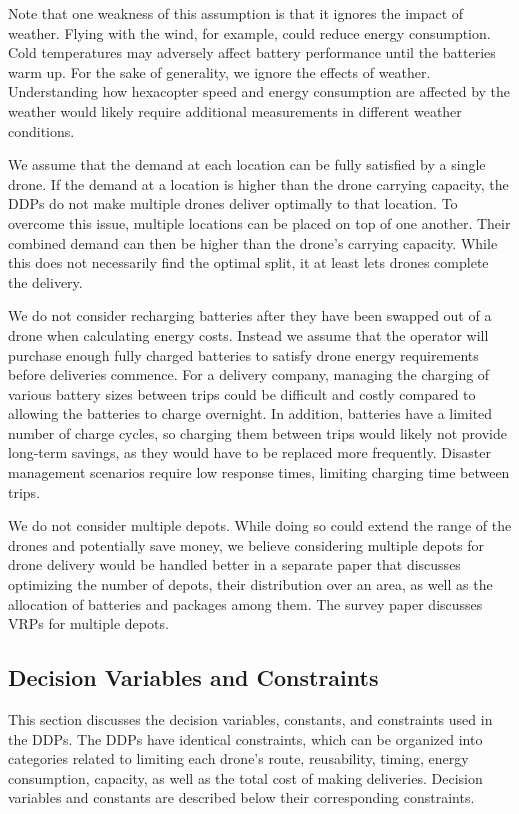\documentclass[journal]{IEEEtran}
\begin{document}
Note that one weakness of this assumption is that it ignores the impact of weather. Flying with the wind, for example, could reduce energy consumption. Cold temperatures may adversely affect battery performance until the batteries warm up. For the sake of generality, we ignore the effects of weather. Understanding how hexacopter speed and energy consumption are affected by the weather would likely require additional measurements in different weather conditions.

We assume that the demand at each location can be fully satisfied by a single drone. If the demand at a location is higher than the drone carrying capacity, the DDPs do not make multiple drones deliver optimally to that location. To overcome this issue, multiple locations can be placed on top of one another. Their combined demand can then be higher than the drone's carrying capacity. While this does not necessarily find the optimal split, it at least lets drones complete the delivery.

We do not consider recharging batteries after they have been swapped out of a drone when calculating energy costs. Instead we assume that the operator will purchase enough fully charged batteries to satisfy drone energy requirements before deliveries commence. For a delivery company, managing the charging of various battery sizes between trips could be difficult and costly compared to allowing the batteries to charge overnight. In addition, batteries have a limited number of charge cycles, so charging them between trips would likely not provide long-term savings, as they would have to be replaced more frequently. Disaster management scenarios require low response times, limiting charging time between trips.

We do not consider multiple depots. While doing so could extend the range of the drones and potentially save money, we believe considering multiple depots for drone delivery would be handled better in a separate paper that discusses optimizing the number of depots, their distribution over an area, as well as the allocation of batteries and packages among them. The survey paper \cite{MontoyaTorres2015} discusses VRPs for multiple depots.

\subsection{Decision Variables and Constraints}
\label{ssec:constraints}

This section discusses the decision variables, constants, and constraints used in the DDPs. The DDPs have identical constraints, which can be organized into categories related to limiting each drone's route, reusability, timing, energy consumption, capacity, as well as the total cost of making deliveries. Decision variables and constants are described below their corresponding constraints.
\end{document}
